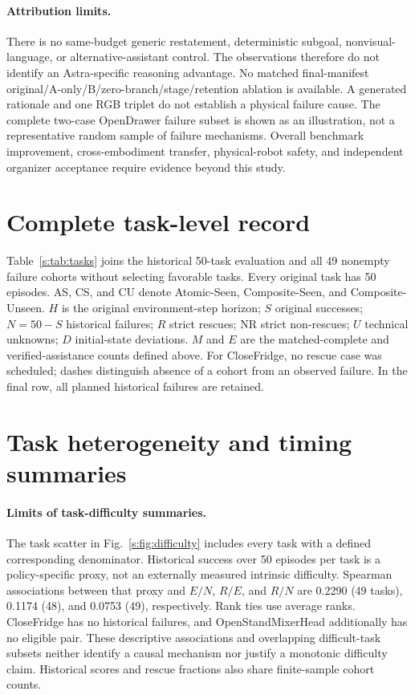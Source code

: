 \paragraph{Attribution limits.}
There is no same-budget generic restatement, deterministic subgoal, nonvisual-language, or alternative-assistant control. The observations therefore do not identify an Astra-specific reasoning advantage. No matched final-manifest original/A-only/B/zero-branch/stage/retention ablation is available. A generated rationale and one RGB triplet do not establish a physical failure cause. The complete two-case OpenDrawer failure subset is shown as an illustration, not a representative random sample of failure mechanisms. Overall benchmark improvement, cross-embodiment transfer, physical-robot safety, and independent organizer acceptance require evidence beyond this study.



\clearpage
\onecolumn
\section{Complete task-level record}
\label{s:tasks}
Table~\ref{s:tab:tasks} joins the historical 50-task evaluation and all 49 nonempty failure cohorts without selecting favorable tasks. Every original task has 50 episodes. AS, CS, and CU denote Atomic-Seen, Composite-Seen, and Composite-Unseen. $H$ is the original environment-step horizon; $S$ original successes; $N=50-S$ historical failures; $R$ strict rescues; NR strict non-rescues; $U$ technical unknowns; $D$ initial-state deviations. $M$ and $E$ are the matched-complete and verified-assistance counts defined above. For CloseFridge, no rescue case was scheduled; dashes distinguish absence of a cohort from an observed failure. In the final row, all planned historical failures are retained.


\clearpage
\section{Task heterogeneity and timing summaries}
\paragraph{Limits of task-difficulty summaries.}
The task scatter in Fig.~\ref{s:fig:difficulty} includes every task with a defined corresponding denominator. Historical success over 50 episodes per task is a policy-specific proxy, not an externally measured intrinsic difficulty. Spearman associations between that proxy and $E/N$, $R/E$, and $R/N$ are 0.2290 (49 tasks), 0.1174 (48), and 0.0753 (49), respectively. Rank ties use average ranks. CloseFridge has no historical failures, and OpenStandMixerHead additionally has no eligible pair. These descriptive associations and overlapping difficult-task subsets neither identify a causal mechanism nor justify a monotonic difficulty claim. Historical scores and rescue fractions also share finite-sample cohort counts.


